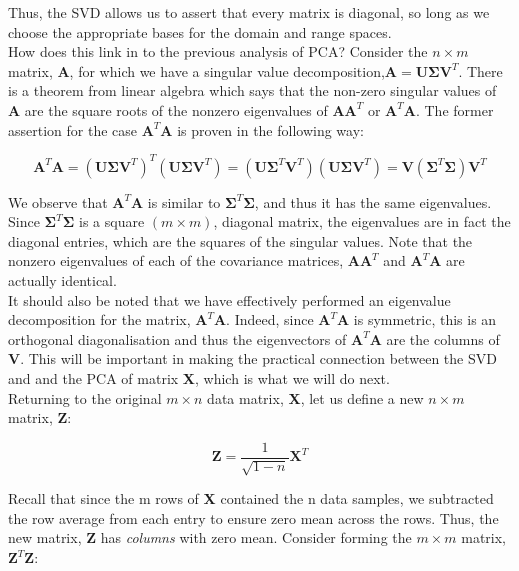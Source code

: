 \documentclass[12pt]{article}
\theoremstyle{plain}
\begin{document}
Thus, the SVD allows us to assert that every matrix is diagonal, so long as we choose the appropriate bases for the domain and range spaces.
\\

How does this link in to the previous analysis of PCA? Consider the $n\times m$ matrix, \textbf{A}, for which we have a singular value decomposition,$\textbf{A} =\textbf{U}\mathbf{\Sigma}\textbf{V}^T$. There is a theorem from linear algebra which says that the non-zero singular values of \textbf{A} are the square roots of the
nonzero eigenvalues of $\textbf{A}\textbf{A}^T$ or $\textbf{A}^T\textbf{A}$. The former assertion for the case $\textbf{A}^T\textbf{A}$ is proven in the following way:

\begin{equation}
\textbf{A}^T\textbf{A}=(\textbf{U}\mathbf{\Sigma}\textbf{V}^T)^T(\textbf{U}\mathbf{\Sigma}\textbf{V}^T)=
(\textbf{U}\mathbf{\Sigma}^T\textbf{V}^T)(\textbf{U}\mathbf{\Sigma}\textbf{V}^T)=
\textbf{V}(\mathbf{\Sigma}^T\mathbf{\Sigma})\textbf{V}^T
\end{equation}

We observe that $\textbf{A}^T\textbf{A}$ is similar to $\mathbf{\Sigma}^T\mathbf{\Sigma}$, and thus it has the same eigenvalues. Since $\mathbf{\Sigma}^T\mathbf{\Sigma}$ is a square $(m\times m)$, diagonal matrix, the eigenvalues are in fact the diagonal entries, which are the squares of the singular values. Note that the nonzero eigenvalues of each of the covariance matrices, $\textbf{A}\textbf{A}^T$ and $\textbf{A}^T\textbf{A}$ are actually identical.
\\


It should also be noted that we have effectively performed an eigenvalue decomposition for the matrix,  $\textbf{A}^T\textbf{A}$. Indeed, since  $\textbf{A}^T\textbf{A}$ is symmetric, this is an orthogonal diagonalisation
and thus the eigenvectors of  $\textbf{A}^T\textbf{A}$ are the columns of \textbf{V}. This will be important in making
the practical connection between the SVD and and the PCA of matrix \textbf{X}, which is what we will do next.
\\

Returning to the original $m\times n$ data matrix, \textbf{X}, let us define a new $n\times m$ matrix, \textbf{Z}:

\begin{equation}
\textbf{Z} = \frac{1}{\sqrt{1-n}}\textbf{X}^T
\end{equation}

Recall that since the m rows of \textbf{X} contained the n data samples, we subtracted the row average from each entry to ensure zero mean across the rows. Thus, the new matrix, \textbf{Z} has \emph{columns} with zero mean. Consider forming the $m\times m$ matrix, $\textbf{Z}^T\textbf{Z}$:
\end{document}
